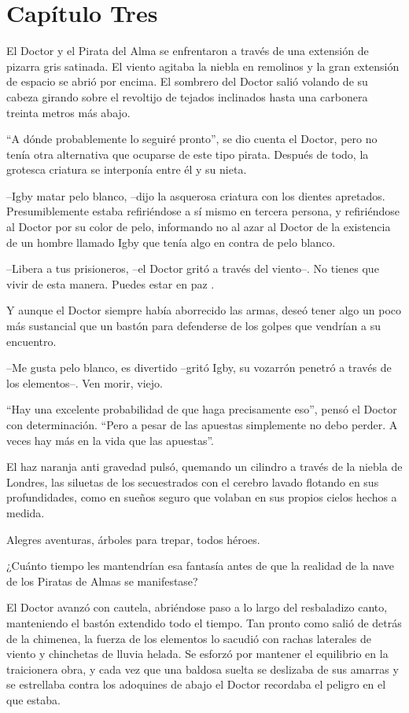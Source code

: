 \chapter*{Capítulo Tres}

El Doctor y el Pirata del Alma se enfrentaron a través de una extensión de pizarra gris satinada. El viento agitaba la niebla en remolinos y la gran extensión de espacio se abrió por encima. El sombrero del Doctor salió volando de su cabeza girando sobre el revoltijo de tejados inclinados hasta una carbonera treinta metros más abajo.
 
``A dónde probablemente lo seguiré pronto'', se dio cuenta el Doctor, pero no tenía otra alternativa que ocuparse de este tipo pirata. Después de todo, la grotesca criatura se interponía entre él y su nieta.
 
--Igby matar pelo blanco, --dijo la asquerosa criatura con los dientes apretados. Presumiblemente estaba refiriéndose a sí mismo en tercera persona, y refiriéndose al Doctor por su color de pelo, informando no al azar al Doctor de la existencia de un hombre llamado Igby que tenía algo en contra de pelo blanco.
 
--Libera a tus prisioneros, --el Doctor gritó a través del viento--. No tienes que vivir de esta manera. Puedes estar en paz .
 
Y aunque el Doctor siempre había aborrecido las armas, deseó tener algo un poco más sustancial que un bastón para defenderse de los golpes que vendrían a su encuentro.
 
--Me gusta pelo blanco, es divertido --gritó Igby, su vozarrón penetró a través de los elementos--. Ven morir, viejo.
 
``Hay una excelente probabilidad de que haga precisamente eso'', pensó el Doctor con determinación. ``Pero a pesar de las apuestas simplemente no debo perder. A veces hay más en la vida que las apuestas''.
 
El haz naranja anti gravedad pulsó, quemando un cilindro a través de la niebla de Londres, las siluetas de los secuestrados con el cerebro lavado flotando en sus profundidades, como en sueños seguro que volaban en sus propios cielos hechos a medida.
 
Alegres aventuras, árboles para trepar, todos héroes.
 
¿Cuánto tiempo les mantendrían esa fantasía antes de que la realidad de la nave de los Piratas de Almas se manifestase?
 
El Doctor avanzó con cautela, abriéndose paso a lo largo del resbaladizo canto, manteniendo el bastón extendido todo el tiempo. Tan pronto como salió de detrás de la chimenea, la fuerza de los elementos lo sacudió con rachas laterales de viento y chinchetas de lluvia helada. Se esforzó por mantener el equilibrio en la traicionera obra, y cada vez que una baldosa suelta se deslizaba de sus amarras y se estrellaba contra los adoquines de abajo el Doctor recordaba el peligro en el que estaba.
 
